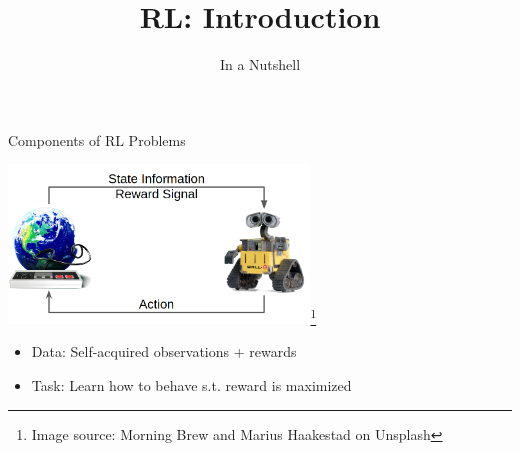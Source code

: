 


\title[ML-RL: Big Picture]{RL: Introduction}
\subtitle{In a Nutshell}




	
\maketitle

\begin{frame}[c]{Components of RL Problems}
	
	\centering
	\includegraphics[width=0.6\textwidth]{images/rl_comic.png}\footnote{Image source: Morning Brew and Marius Haakestad on Unsplash}
	
	\bigskip
	
	\begin{itemize}
		\item Data: Self-acquired observations + rewards
		\item Task: Learn how to behave s.t. reward is maximized
	\end{itemize}	
	
\end{frame}
